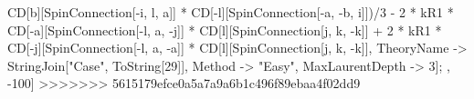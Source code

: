 CD[b][SpinConnection[-i, l, a]] * CD[-l][SpinConnection[-a, -b, i]])/3 - 2 * kR1 * CD[-a][SpinConnection[-l, a, -j]] * CD[l][SpinConnection[j, k, -k]] + 2 * kR1 * CD[-j][SpinConnection[-l, a, -a]] * CD[l][SpinConnection[j, k, -k]], TheoryName -> StringJoin["Case", ToString[29]], Method -> "Easy", MaxLaurentDepth -> 3]; , -100]
>>>>>>> 5615179efce0a5a7a9a6b1c496f89ebaa4f02dd9
